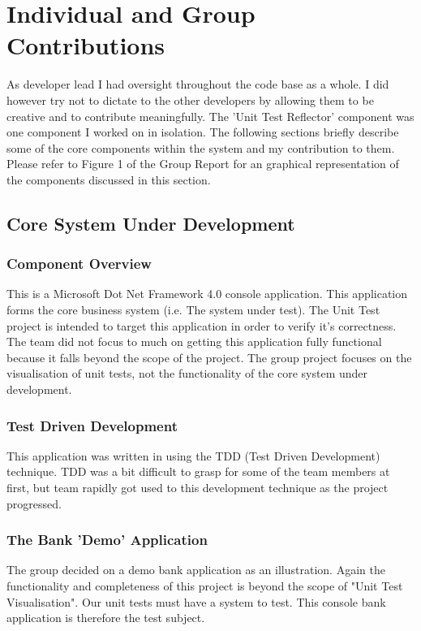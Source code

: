 \documentclass[a4paper,12pt]{article}
\begin{document}
\section{Individual and Group Contributions}
As developer lead I had oversight throughout the code base as a whole. I did however try not to dictate to the other developers by allowing them to be creative and to contribute meaningfully. The 'Unit Test Reflector' component was one component I worked on in isolation. The following sections briefly describe some of the core components within the system and my contribution to them.\\
\linebreak
Please refer to Figure 1 of the Group Report\cite{groupReport} for an graphical representation of the components discussed in this section.
 
\subsection{Core System Under Development}
\subsubsection{Component Overview}
This is a Microsoft Dot Net Framework 4.0\cite{dotNetFramework} console application. This application forms the core business system (i.e. The system under test). The Unit Test project is intended to target this application in order to verify it's correctness. The team did not focus to much on getting this application fully functional because it falls beyond the scope of the project. The group project focuses on the visualisation of unit tests, not the functionality of the core system under development.
\subsubsection{Test Driven Development}
This application was written in using the TDD (Test Driven Development\cite{tdd}) technique. TDD was a bit difficult to grasp for some of the team members at first, but team rapidly got used to this development technique as the project progressed.
\subsubsection{The Bank 'Demo' Application}
The group decided on a demo bank application as an illustration. Again the functionality and completeness of this project is beyond the scope of "Unit Test Visualisation". Our unit tests must have a system to test. This console bank application is therefore the test subject.
\end{document}
